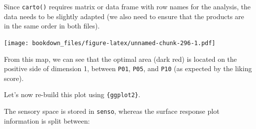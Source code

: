 \documentclass[
]{krantz}
\makeatletter
\newenvironment{Shaded}{\begin{snugshade}}{\end{snugshade}}
\newcommand{\AttributeTok}[1]{\textcolor[rgb]{0.61,0.61,0.61}{#1}}
\newcommand{\ConstantTok}[1]{\textcolor[rgb]{0,0,0}{#1}}
\newcommand{\DecValTok}[1]{\textcolor[rgb]{0.06,0.06,0.06}{#1}}
\newcommand{\FunctionTok}[1]{\textcolor[rgb]{0,0,0}{#1}}
\newcommand{\NormalTok}[1]{#1}
\newcommand{\OtherTok}[1]{\textcolor[rgb]{0.37,0.37,0.37}{#1}}
\newcommand{\SpecialCharTok}[1]{\textcolor[rgb]{0,0,0}{#1}}
\newcommand{\StringTok}[1]{\textcolor[rgb]{0.5,0.5,0.5}{#1}}
\newenvironment{kframe}{%
\medskip{}
\setlength{\fboxsep}{.8em}
 \def\at@end@of@kframe{}%
 \ifinner\ifhmode%
  \def\at@end@of@kframe{\end{minipage}}%
  \begin{minipage}{\columnwidth}%
 \fi\fi%
 \def\FrameCommand##1{\hskip\@totalleftmargin \hskip-\fboxsep
 \colorbox{shadecolor}{##1}\hskip-\fboxsep
     \hskip-\linewidth \hskip-\@totalleftmargin \hskip\columnwidth}%
 \MakeFramed {\advance\hsize-\width
   \@totalleftmargin\z@ \linewidth\hsize
   \@setminipage}}%
 {\par\unskip\endMakeFramed%
 \at@end@of@kframe}
\renewenvironment{Shaded}{\begin{kframe}}{\end{kframe}}
\makeatother
\begin{document}
Since \texttt{carto()} requires matrix or data frame with row names for the analysis, the data needs to be slightly adapted (we also need to ensure that the products are in the same order in both files).

\begin{Shaded}
\end{Shaded}

\texttt{[image: bookdown\_files/figure-latex/unnamed-chunk-296-1.pdf]}

From this map, we can see that the optimal area (dark red) is located on the positive side of dimension 1, between \texttt{P01}, \texttt{P05}, and \texttt{P10} (as expected by the liking score).

Let's now re-build this plot using \texttt{\{ggplot2\}}.

The sensory space is stored in \texttt{senso}, whereas the surface response plot information is split between:
\end{document}
